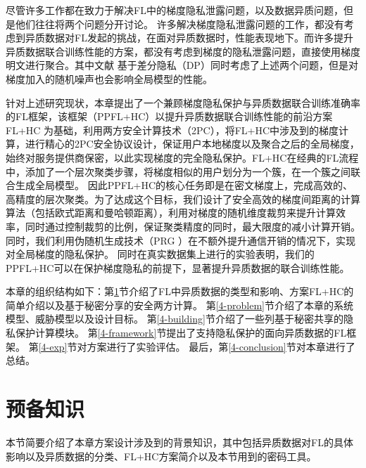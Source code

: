 尽管许多工作都在致力于解决FL中的梯度隐私泄露问题，以及数据异质问题，但是他们往往将两个问题分开讨论。
许多解决梯度隐私泄露问题的工作，都没有考虑到异质数据对FL发起的挑战，在面对异质数据时，性能表现地下。而许多提升异质数据联合训练性能的方案，都没有考虑到梯度的隐私泄露问题，直接使用梯度明文进行聚合。其中文献 \cite{xiong2021privacy} 基于差分隐私（DP）同时考虑了上述两个问题，但是对梯度加入的随机噪声也会影响全局模型的性能。

针对上述研究现状，本章提出了一个兼顾梯度隐私保护与异质数据联合训练准确率的FL框架，该框架（PPFL+HC）以提升异质数据联合训练性能的前沿方案FL+HC \cite{briggs2020federated} 为基础，利用两方安全计算技术（2PC），将FL+HC中涉及到的梯度计算，进行精心的2PC安全协议设计，保证用户本地梯度以及聚合之后的全局梯度，始终对服务提供商保密，以此实现梯度的完全隐私保护。FL+HC在经典的FL流程中，添加了一个层次聚类步骤，将梯度相似的用户划分为一个簇，在一个簇之间联合生成全局模型。
因此PPFL+HC的核心任务即是在密文梯度上，完成高效的、高精度的层次聚类。为了达成这个目标，我们设计了安全高效的梯度间距离的计算算法（包括欧式距离和曼哈顿距离），利用对梯度的随机维度裁剪来提升计算效率，同时通过控制裁剪的比例，保证聚类精度的同时，最大限度的减小计算开销。同时，我们利用伪随机生成技术（PRG \cite{yao1982theory}）在不额外提升通信开销的情况下，实现对全局梯度的隐私保护。
同时在真实数据集上进行的实验表明，我们的PPFL+HC可以在保护梯度隐私的前提下，显著提升异质数据的联合训练性能。

本章的组织结构如下：第\ref{4-pre}节介绍了FL中异质数据的类型和影响、方案FL+HC的简单介绍以及基于秘密分享的安全两方计算。
第\ref{4-problem}节介绍了本章的系统模型、威胁模型以及设计目标。
第\ref{4-building}节介绍了一些列基于秘密共享的隐私保护计算模块。
第\ref{4-framework}节提出了支持隐私保护的面向异质数据的FL框架。
第\ref{4-exp}节对方案进行了实验评估。
最后，第\ref{4-conclusion}节对本章进行了总结。

\section{预备知识}\label{4-pre}
本节简要介绍了本章方案设计涉及到的背景知识，其中包括异质数据对FL的具体影响以及异质数据的分类、FL+HC方案简介以及本节用到的密码工具。

